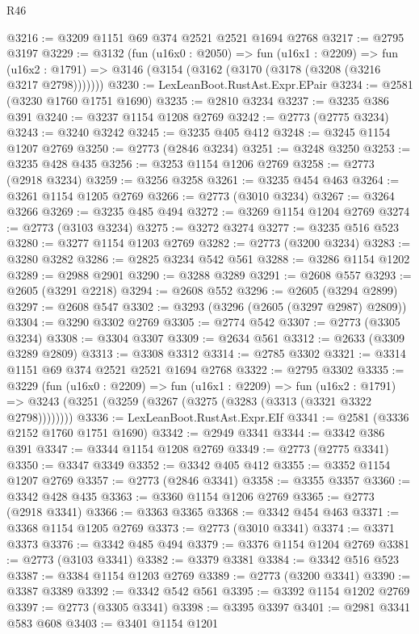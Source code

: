 \begin{lexlean}{R46}
\begin{coremodule}
@3216 := @3209 @1151 @69 @374 @2521 @2521 @1694 @2768
@3217 := @2795 @3197
@3229 := @3132
    (fun (u16x0 : @2050) =>
    fun (u16x1 : @2209) =>
    fun (u16x2 : @1791) => @3146 (@3154 (@3162 (@3170 (@3178 (@3208 (@3216 @3217 @2798)))))))
@3230 := LexLeanBoot.RustAst.Expr.EPair
@3234 := @2581 (@3230 @1760 @1751 @1690)
@3235 := @2810 @3234
@3237 := @3235 @386 @391
@3240 := @3237 @1154 @1208 @2769
@3242 := @2773 (@2775 @3234)
@3243 := @3240 @3242
@3245 := @3235 @405 @412
@3248 := @3245 @1154 @1207 @2769
@3250 := @2773 (@2846 @3234)
@3251 := @3248 @3250
@3253 := @3235 @428 @435
@3256 := @3253 @1154 @1206 @2769
@3258 := @2773 (@2918 @3234)
@3259 := @3256 @3258
@3261 := @3235 @454 @463
@3264 := @3261 @1154 @1205 @2769
@3266 := @2773 (@3010 @3234)
@3267 := @3264 @3266
@3269 := @3235 @485 @494
@3272 := @3269 @1154 @1204 @2769
@3274 := @2773 (@3103 @3234)
@3275 := @3272 @3274
@3277 := @3235 @516 @523
@3280 := @3277 @1154 @1203 @2769
@3282 := @2773 (@3200 @3234)
@3283 := @3280 @3282
@3286 := @2825 @3234 @542 @561
@3288 := @3286 @1154 @1202
@3289 := @2988 @2901
@3290 := @3288 @3289
@3291 := @2608 @557
@3293 := @2605 (@3291 @2218)
@3294 := @2608 @552
@3296 := @2605 (@3294 @2899)
@3297 := @2608 @547
@3302 := @3293 (@3296 (@2605 (@3297 @2987) @2809))
@3304 := @3290 @3302 @2769
@3305 := @2774 @542
@3307 := @2773 (@3305 @3234)
@3308 := @3304 @3307
@3309 := @2634 @561
@3312 := @2633 (@3309 @3289 @2809)
@3313 := @3308 @3312
@3314 := @2785 @3302
@3321 := @3314 @1151 @69 @374 @2521 @2521 @1694 @2768
@3322 := @2795 @3302
@3335 := @3229
    (fun (u16x0 : @2209) =>
    fun (u16x1 : @2209) =>
    fun (u16x2 : @1791) =>
    @3243 (@3251 (@3259 (@3267 (@3275 (@3283 (@3313 (@3321 @3322 @2798))))))))
@3336 := LexLeanBoot.RustAst.Expr.EIf
@3341 := @2581 (@3336 @2152 @1760 @1751 @1690)
@3342 := @2949 @3341
@3344 := @3342 @386 @391
@3347 := @3344 @1154 @1208 @2769
@3349 := @2773 (@2775 @3341)
@3350 := @3347 @3349
@3352 := @3342 @405 @412
@3355 := @3352 @1154 @1207 @2769
@3357 := @2773 (@2846 @3341)
@3358 := @3355 @3357
@3360 := @3342 @428 @435
@3363 := @3360 @1154 @1206 @2769
@3365 := @2773 (@2918 @3341)
@3366 := @3363 @3365
@3368 := @3342 @454 @463
@3371 := @3368 @1154 @1205 @2769
@3373 := @2773 (@3010 @3341)
@3374 := @3371 @3373
@3376 := @3342 @485 @494
@3379 := @3376 @1154 @1204 @2769
@3381 := @2773 (@3103 @3341)
@3382 := @3379 @3381
@3384 := @3342 @516 @523
@3387 := @3384 @1154 @1203 @2769
@3389 := @2773 (@3200 @3341)
@3390 := @3387 @3389
@3392 := @3342 @542 @561
@3395 := @3392 @1154 @1202 @2769
@3397 := @2773 (@3305 @3341)
@3398 := @3395 @3397
@3401 := @2981 @3341 @583 @608
@3403 := @3401 @1154 @1201

\end{coremodule}
\end{lexlean}
